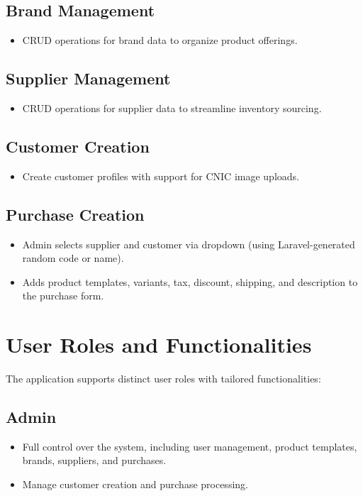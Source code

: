 \documentclass[a4paper,12pt]{article}
\begin{document}
\subsection{Brand Management}
\begin{itemize}
    \item CRUD operations for brand data to organize product offerings.
\end{itemize}

\subsection{Supplier Management}
\begin{itemize}
    \item CRUD operations for supplier data to streamline inventory sourcing.
\end{itemize}

\subsection{Customer Creation}
\begin{itemize}
    \item Create customer profiles with support for CNIC image uploads.
\end{itemize}

\subsection{Purchase Creation}
\begin{itemize}
    \item Admin selects supplier and customer via dropdown (using Laravel-generated random code or name).
    \item Adds product templates, variants, tax, discount, shipping, and description to the purchase form.
\end{itemize}

\section{User Roles and Functionalities}
The application supports distinct user roles with tailored functionalities:

\subsection{Admin}
\begin{itemize}
    \item Full control over the system, including user management, product templates, brands, suppliers, and purchases.
    \item Manage customer creation and purchase processing.
\end{itemize}
\end{document}
